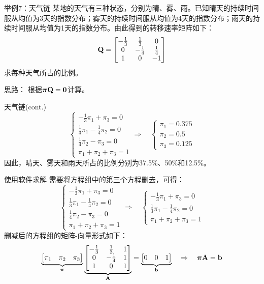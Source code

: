 \documentclass[t]{beamer}
\begin{document}
\begin{frame}{举例7：天气链}
  某地的天气有三种状态，分别为晴、雾、雨。已知晴天的持续时间服从均值为3天的指数分布；雾天的持续时间服从均值为4天的指数分布；雨天的持续时间服从均值为1天的指数分布。由此得到的转移速率矩阵如下：
  \[{\bf Q}=  \begin{bmatrix}
  -\frac{1}{3}&\frac{1}{3}&0\\
  0&-\frac{1}{4}&\frac{1}{4}\\
  1 &0&-1
  \end{bmatrix} \]
  求每种天气所占的比例。

  \begin{block}{思路：}
    根据$\bm{\pi}{\bf Q}={\bf 0}$计算。
  \end{block}
\end{frame}

\begin{frame}{天气链(cont.)}
  \[\begin{cases}
    -\frac{1}{3}\pi_1+\pi_3=0\\ 
   \frac{1}{3}\pi_1-\frac{1}{4}\pi_2=0\\ 
   {\frac{1}{4}\pi_2-\pi_3=0}\\
   \pi_1+\pi_2+\pi_3=1
   \end{cases} \Rightarrow\quad \begin{cases}
   \pi_1=0.375\\
   \pi_2=0.5\\
   \pi_3=0.125
   \end{cases} \]
   因此，晴天、雾天和雨天所占的比例分别为37.5\%、50\%和12.5\%。
\end{frame}


\begin{frame}{使用软件求解}
  需要将方程组中的第三个方程删去，可得：
  \[\begin{cases}
   -\frac{1}{3}\pi_1+\pi_3=0\\
  \frac{1}{3}\pi_1-\frac{1}{4}\pi_2=0\\ 
  {\frac{1}{4}\pi_2-\pi_3=0}\\
  \pi_1+\pi_2+\pi_3=1
  \end{cases} \Rightarrow\quad \begin{cases}
   -\frac{1}{3}\pi_1+\pi_3=0\\
  \frac{1}{3}\pi_1-\frac{1}{4}\pi_2=0\\
  \pi_1+\pi_2+\pi_3=1
  \end{cases}\]
  删减后的方程组的矩阵-向量形式如下：
  \[\underbrace{\begin{bmatrix}
    \pi_1&\pi_2&\pi_3
    \end{bmatrix}}_{\bm\pi}\underbrace{\begin{bmatrix}
  	-\frac{1}{3}&\frac{1}{3}&1\\
  	0&-\frac{1}{4}&1\\
    1 &0&1
    \end{bmatrix}}_{\bf A}=\underbrace{\begin{bmatrix}
    0&0&1
    \end{bmatrix}}_{\bf b} \quad \Rightarrow\quad  \bm{\pi}{\bf A}={\bf b} \]
  \end{frame}
\end{document}
